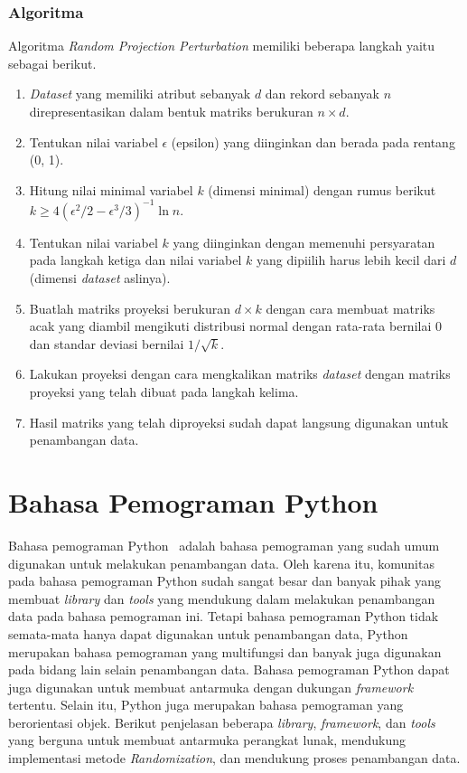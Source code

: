\subsubsection{Algoritma}
\label{subsubsec:algo-projection}

Algoritma \textit{Random Projection Perturbation} memiliki beberapa langkah yaitu sebagai berikut.
\begin{enumerate}
    \item \textit{Dataset} yang memiliki atribut sebanyak \(d\) dan rekord sebanyak \(n\) direpresentasikan dalam bentuk matriks berukuran \(n \times d\).
    \item Tentukan nilai variabel \(\epsilon\) (epsilon) yang diinginkan dan berada pada rentang (0, 1).
    \item Hitung nilai minimal variabel \(k\) (dimensi minimal) dengan rumus berikut \(k \geq 4(\epsilon^{2}/2-\epsilon^{3}/3)^{-1}\ln{n}\).
    \item Tentukan nilai variabel \(k\) yang diinginkan dengan memenuhi persyaratan pada langkah ketiga dan nilai variabel \(k\) yang dipiilih harus lebih kecil dari \(d\) (dimensi \textit{dataset} aslinya).
    \item Buatlah matriks proyeksi berukuran \(d \times k\) dengan cara membuat matriks acak yang diambil mengikuti distribusi normal dengan rata-rata bernilai 0 dan standar deviasi bernilai \(1/\sqrt{k}\).
    \item Lakukan proyeksi dengan cara mengkalikan matriks \textit{dataset} dengan matriks proyeksi yang telah dibuat pada langkah kelima.
    \item Hasil matriks yang telah diproyeksi sudah dapat langsung digunakan untuk penambangan data.
\end{enumerate}

\section{Bahasa Pemograman Python}
\label{sec:python}

Bahasa pemograman Python~\cite{python:95:guido} adalah bahasa pemograman yang sudah umum digunakan untuk melakukan penambangan data. Oleh karena itu, komunitas pada bahasa pemograman Python sudah sangat besar dan banyak pihak yang membuat \textit{library} dan \textit{tools} yang mendukung dalam melakukan penambangan data pada bahasa pemograman ini. Tetapi bahasa pemograman Python tidak semata-mata hanya dapat digunakan untuk penambangan data, Python merupakan bahasa pemograman yang multifungsi dan banyak juga digunakan pada bidang lain selain penambangan data. Bahasa pemograman Python dapat juga digunakan untuk membuat antarmuka dengan dukungan \textit{framework} tertentu. Selain itu, Python juga merupakan bahasa pemograman yang berorientasi objek. Berikut penjelasan beberapa \textit{library}, \textit{framework}, dan \textit{tools} yang berguna untuk membuat antarmuka perangkat lunak, mendukung implementasi metode \textit{Randomization}, dan mendukung proses penambangan data.

